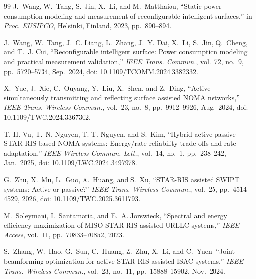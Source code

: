 \documentclass[journal]{IEEEtran}
\begin{document}
\begin{thebibliography}{99}
J.~Wang, W.~Tang, S.~Jin, X.~Li, and M.~Matthaiou,
``Static power consumption modeling and measurement of reconfigurable intelligent surfaces,''
in \emph{Proc. EUSIPCO}, Helsinki, Finland, 2023, pp.~890--894.

J.~Wang, W.~Tang, J.~C. Liang, L.~Zhang, J.~Y. Dai, X.~Li, S.~Jin, Q.~Cheng, and T.~J. Cui,
``Reconfigurable intelligent surface: Power consumption modeling and practical measurement validation,''
\emph{IEEE Trans. Commun.}, vol.~72, no.~9, pp.~5720--5734, Sep.~2024, doi: 10.1109/TCOMM.2024.3382332.


X.~Yue, J.~Xie, C.~Ouyang, Y.~Liu, X.~Shen, and Z.~Ding,
``Active simultaneously transmitting and reflecting surface assisted NOMA networks,''
\emph{IEEE Trans. Wireless Commun.}, vol.~23, no.~8, pp.~9912--9926, Aug.~2024, doi: 10.1109/TWC.2024.3367302.

T.-H. Vu, T.~N. Nguyen, T.-T. Nguyen, and S.~Kim,
``Hybrid active-passive STAR-RIS-based NOMA systems: Energy/rate-reliability trade-offs and rate adaptation,''
\emph{IEEE Wireless Commun. Lett.}, vol.~14, no.~1, pp.~238--242, Jan.~2025, doi: 10.1109/LWC.2024.3497978.

G.~Zhu, X.~Mu, L.~Guo, A.~Huang, and S.~Xu,
``STAR-RIS assisted SWIPT systems: Active or passive?''
\emph{IEEE Trans. Wireless Commun.}, vol.~25, pp.~4514--4529, 2026, doi: 10.1109/TWC.2025.3611793.

M.~Soleymani, I.~Santamaria, and E.~A. Jorswieck,
``Spectral and energy efficiency maximization of MISO STAR-RIS-assisted URLLC systems,''
\emph{IEEE Access}, vol.~11, pp.~70833--70852, 2023.

S.~Zhang, W.~Hao, G.~Sun, C.~Huang, Z.~Zhu, X.~Li, and C.~Yuen,
``Joint beamforming optimization for active STAR-RIS-assisted ISAC systems,''
\emph{IEEE Trans. Wireless Commun.}, vol.~23, no.~11, pp.~15888--15902, Nov.~2024.

\end{thebibliography}
\endgroup
\end{document}
